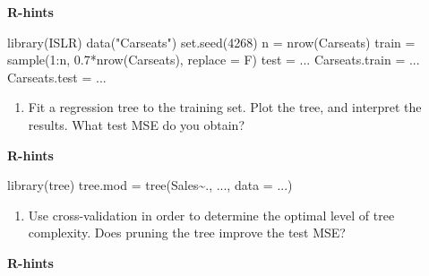 \documentclass[
]{article}
\newenvironment{Shaded}{\begin{snugshade}}{\end{snugshade}}
\newcommand{\AttributeTok}[1]{\textcolor[rgb]{0.77,0.63,0.00}{#1}}
\newcommand{\DecValTok}[1]{\textcolor[rgb]{0.00,0.00,0.81}{#1}}
\newcommand{\FloatTok}[1]{\textcolor[rgb]{0.00,0.00,0.81}{#1}}
\newcommand{\FunctionTok}[1]{\textcolor[rgb]{0.00,0.00,0.00}{#1}}
\newcommand{\NormalTok}[1]{#1}
\newcommand{\OtherTok}[1]{\textcolor[rgb]{0.56,0.35,0.01}{#1}}
\newcommand{\SpecialCharTok}[1]{\textcolor[rgb]{0.00,0.00,0.00}{#1}}
\newcommand{\StringTok}[1]{\textcolor[rgb]{0.31,0.60,0.02}{#1}}
\providecommand{\tightlist}{%
  \setlength{\itemsep}{0pt}\setlength{\parskip}{0pt}}
\begin{document}
\textbf{R-hints}

\begin{Shaded}
\begin{Highlighting}[]
\FunctionTok{library}\NormalTok{(ISLR)}
\FunctionTok{data}\NormalTok{(}\StringTok{"Carseats"}\NormalTok{)}
\FunctionTok{set.seed}\NormalTok{(}\DecValTok{4268}\NormalTok{)}
\NormalTok{n }\OtherTok{=} \FunctionTok{nrow}\NormalTok{(Carseats)}
\NormalTok{train }\OtherTok{=} \FunctionTok{sample}\NormalTok{(}\DecValTok{1}\SpecialCharTok{:}\NormalTok{n, }\FloatTok{0.7}\SpecialCharTok{*}\FunctionTok{nrow}\NormalTok{(Carseats), }\AttributeTok{replace =}\NormalTok{ F)}
\NormalTok{test }\OtherTok{=}\NormalTok{ ...}
\NormalTok{Carseats.train }\OtherTok{=}\NormalTok{ ...}
\NormalTok{Carseats.test }\OtherTok{=}\NormalTok{ ...}
\end{Highlighting}
\end{Shaded}

\begin{enumerate}
\def\labelenumi{\alph{enumi})}
\setcounter{enumi}{1}
\tightlist
\item
  Fit a regression tree to the training set. Plot the tree, and
  interpret the results. What test MSE do you obtain?
\end{enumerate}

\textbf{R-hints}

\begin{Shaded}
\begin{Highlighting}[]
\FunctionTok{library}\NormalTok{(tree)}
\NormalTok{tree.mod }\OtherTok{=} \FunctionTok{tree}\NormalTok{(Sales}\SpecialCharTok{\textasciitilde{}}\NormalTok{., ..., }\AttributeTok{data =}\NormalTok{ ...)}
\end{Highlighting}
\end{Shaded}

\begin{enumerate}
\def\labelenumi{\alph{enumi})}
\setcounter{enumi}{2}
\tightlist
\item
  Use cross-validation in order to determine the optimal level of tree
  complexity. Does pruning the tree improve the test MSE?
\end{enumerate}

\textbf{R-hints}

\begin{Shaded}
\end{Shaded}
\end{document}
